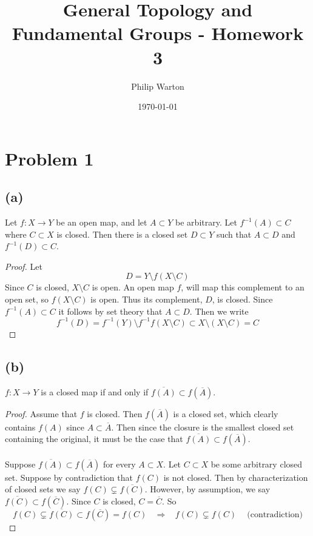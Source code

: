 \documentclass{article}
\theoremstyle{definition}
\begin{document}
\title{General Topology and Fundamental Groups - Homework 3}
\author{Philip Warton}
\date{\today}
\maketitle
\section*{Problem 1}
    \subsection*{(a)}
    \begin{mdframed}
        Let $f: X \rightarrow Y$ be an open map, and let $A \subset Y$ be arbitrary.
        Let $f^{-1}(A) \subset C$ where $C \subset X$ is closed. Then there is a closed set $D \subset Y$ such that 
        $A \subset D$ and $f^{-1}(D) \subset C$.
    \end{mdframed}
    \begin{proof}
        Let 
        \[
            D = Y \setminus f(X \setminus C)
        \]
        Since $C$ is closed, $X \setminus C$ is open. An open map $f$, will map this complement to an open set, so $f(X \setminus C)$ is open.
        Thus its complement, $D$, is closed. Since $f^{-1}(A) \subset C$ it follows by set theory that $A \subset D$.
        Then we write
        \[
            f^{-1}(D) = f^{-1}(Y) \setminus f^{-1}f(X \setminus C) \subset X \setminus (X \setminus C) = C
        \]
    \end{proof}
    \subsection*{(b)}
        \begin{mdframed}
            $f:X \rightarrow Y$ is a closed map if and only if $\overline{f(A)} \subset f(\overline{A})$.
        \end{mdframed}
        \begin{proof}
            \fbox{$\Rightarrow$} Assume that $f$ is closed. Then $f(\overline{A})$ is a closed set, which
            clearly contains $f(A)$ since $A \subset \overline{A}$. Then since the closure is the smallest closed 
            set containing the original, it must be the case that $\overline{f(A)} \subset f(\overline{A})$.\\\\
            \fbox{$\Leftarrow$} Suppose $\overline{f(A)} \subset f(\overline{A})$ for every $A \subset X$.
            Let $C \subset X$ be some arbitrary closed set. Suppose by contradiction that $f(C)$ is not closed.
            Then by characterization of closed sets we say $f(C) \subsetneq \overline{f(C)}$. However, by assumption, 
            we say $\overline{f(C)} \subset f(\overline{C})$. Since $C$ is closed, $C = \overline{C}$. So 
            \[
                f(C) \subsetneq \overline{f(C)} \subset f(\overline{C}) = f(C) \ \ \ \ \Longrightarrow \ \ \ \ f(C) \subsetneq f(C) \ \ \ \ \text{ (contradiction)}
            \]
        \end{proof}
\end{document}
